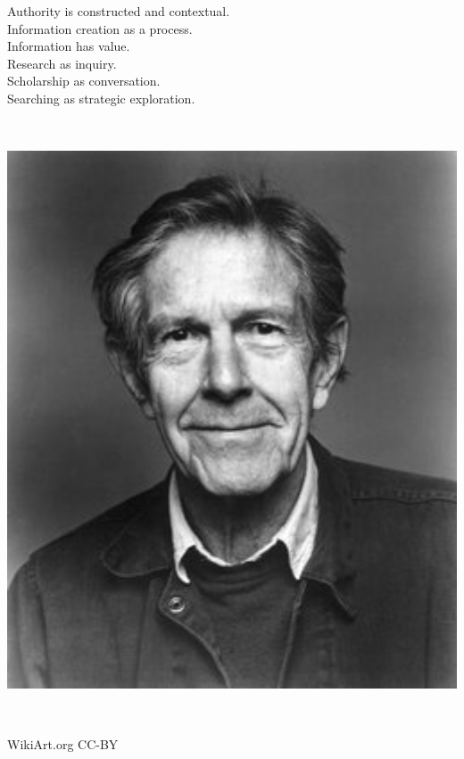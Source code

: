 \documentclass[17pt]{extarticle}
\begin{document}


\newpage


\vspace*{0.5in}

{\Huge

  \begin{center}

    Authority is constructed and contextual. \\
    [ 0.5\baselineskip ]
    Information creation as a process. \\
    [ 0.5\baselineskip ]
    Information has value. \\
    [ 0.5\baselineskip ]
    Research as inquiry. \\
    [ 0.5\baselineskip ]
    Scholarship as conversation. \\
    [ 0.5\baselineskip ]
    Searching as strategic exploration.

    \end{center}

}

\newpage


\begin{center}
  \includegraphics[height=7in]{images/john-cage-portrait.jpg}

  {\small WikiArt.org CC-BY }
\end{center}
\end{document}
